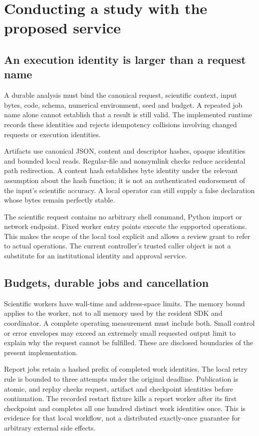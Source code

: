 \chapter{Conducting a study with the proposed service}
\label{in:operations}

\section{An execution identity is larger than a request name}

A durable analysis must bind the canonical request, scientific context, input
bytes, code, schema, numerical environment, seed and budget. A repeated job
name alone cannot establish that a result is still valid. The implemented
runtime records these identities and rejects idempotency collisions involving
changed requests or execution identities.~\citep{v12_in_runtime}

Artifacts use canonical JSON, content and descriptor hashes, opaque identities
and bounded local reads. Regular-file and nonsymlink checks reduce accidental
path redirection. A content hash establishes byte identity under the relevant
assumption about the hash function; it is not an authenticated endorsement of
the input's scientific accuracy. A local operator can still supply a false
declaration whose bytes remain perfectly stable.

The scientific request contains no arbitrary shell command, Python import or
network endpoint. Fixed worker entry points execute the supported operations.
This makes the scope of the local tool explicit and allows a review grant to
refer to actual operations. The current controller's trusted caller object is
not a substitute for an institutional identity and approval service.

\section{Budgets, durable jobs and cancellation}

Scientific workers have wall-time and address-space limits. The memory bound
applies to the worker, not to all memory used by the resident SDK and
coordinator. A complete operating measurement must include both. Small control
or error envelopes may exceed an extremely small requested output limit to
explain why the request cannot be fulfilled. These are disclosed boundaries of
the present implementation.~\citep{v12_in_runtime}

Report jobs retain a hashed prefix of completed work identities. The local
retry rule is bounded to three attempts under the original deadline. Publication
is atomic, and replay checks request, artifact and checkpoint identities before
continuation. The recorded restart fixture kills a report worker after its
first checkpoint and completes all one hundred distinct work identities once.
This is evidence for that local workflow, not a distributed exactly-once
guarantee for arbitrary external side effects.

